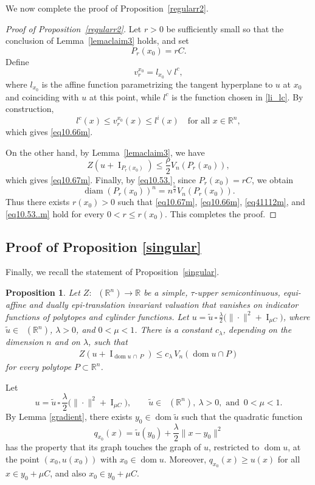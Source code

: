 \documentclass[11pt]{article}
\newtheorem{prop}[teo]{Proposition}
\theoremstyle{definition} %
\newcommand{\RR}{(\mathbb{R}^n)}
\DeclareMathOperator{\I}{I}
\DeclareMathOperator{\dom}{dom}
\DeclareMathOperator{\LP}{Conv_{lp}}
\DeclareMathOperator{\diam}{diam}
\begin{document}
We now complete the proof of Proposition~\ref{regularr2}.

\begin{proof}[Proof of Proposition~\ref{regularr2}]
Let $r>0$ be sufficiently small so that the conclusion of Lemma~\ref{lemaclaim3} holds, and set
\[
P_r(x_0)=rC.
\]
Define
\[
v_r^{x_0}=l_{x_0}\vee l^c,
\]
where $l_{x_0}$ is the affine function parametrizing the tangent hyperplane to $u$ at $x_0$ and coinciding with $u$ at this point, while $l^c$ is the function chosen in \eqref{li_lc}. By construction,
\[
l^c(x)\le v_r^{x_0}(x)\le l^i(x)
\quad\text{for all }x\in\mathbb{R}^n,
\]
which gives \eqref{eq10.66m}.

On the other hand, by Lemma~\ref{lemaclaim3}, we have
\[
Z(u+\I_{P_r(x_0)})
\leq \frac{\rho}{2}V_n(P_r(x_0)),
\]
which gives \eqref{eq10.67m}. Finally, by \eqref{eq10.53.}, since $P_r(x_0)=rC$, we obtain
\[
\diam(P_r(x_0))^n
=
n^{\frac n2}V_n(P_r(x_0)).
\]
Thus there exists $r(x_0)>0$ such that \eqref{eq10.67m}, \eqref{eq10.66m}, \eqref{eq41112m}, and \eqref{eq10.53..m} hold for every $0<r\leq r(x_0)$. This completes the proof.
\end{proof}




\subsection{Proof of Proposition \ref{singular}}

Finally, we recall the statement of Proposition~\ref{singular}.

\begin{prop}\label{singularr}
Let $Z:\LP\RR\rightarrow\mathbb{R}$ be a simple, $\tau$-upper semicontinuous, equi-affine and  dually epi-translation   invariant valuation that   vanishes on  indicator functions of polytopes and cylinder functions. Let $u = \tilde{u}\,\square\, \frac{\lambda}{2}\big(\|\cdot\|^2+\I_{\mu C}\big)$, where $\tilde{u}\in \LP(\mathbb{R}^n)$,  $ \lambda>0$, and $0<\mu<1$.   There is a constant $c_{\lambda}$, depending on the dimension $n$ and on $\lambda$, such that
\begin{align*}
    Z(u+\I_{\dom u \, \cap \,P})\leq c_{\lambda}\, V_n(\dom u\cap P) 
\end{align*}
for every polytope $P\subset \mathbb{R}^n$.
\end{prop}




Let 
$$u = \tilde{u}\,\square\, \frac{\lambda}{2}\big(\|\cdot\|^{2}+\I_{\mu C}\big),
\qquad \tilde{u}\in \LP(\mathbb{R}^n),\ \lambda>0, \text{ and }\, 0<\mu< 1.$$
By Lemma \ref{gradient}, there exists $y_0\in \dom \tilde{u}$ such that the quadratic function
$$q_{x_0}(x) = \tilde{u}(y_0) + \frac{\lambda}{2}\|x - y_0\|^2$$
has the property that its graph touches the graph of $u$, restricted to $\dom u$, at the point $(x_0, u(x_0))$ with $x_0\in\dom u$. 
Moreover, $q_{x_0}(x)\ge u(x)$ for all $x\in y_0+\mu C$, and  also $x_0\in y_0+\mu C$. 
\end{document}
